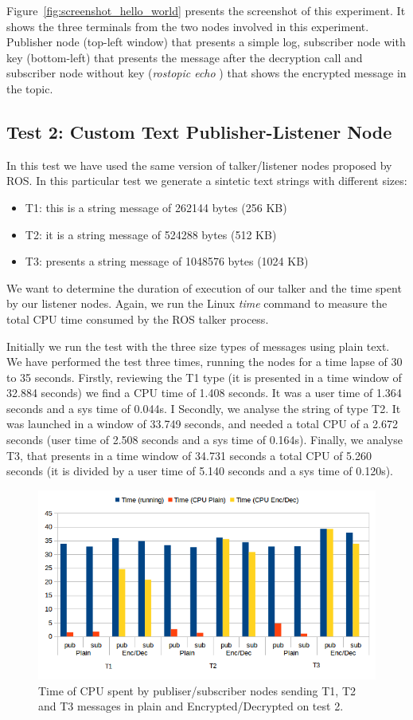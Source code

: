 \documentclass[journal,twoside]{JoPhA}
\begin{document}
Figure~\ref{fig:screenshot_hello_world} presents the screenshot of this experiment. It shows the three terminals from the two nodes involved in this experiment. Publisher node (top-left window) that presents a simple log, subscriber node with key (bottom-left) that presents the message after the decryption call and subscriber node without key ({\em rostopic echo }) that shows the encrypted message in the topic.


\subsection{Test 2: Custom Text Publisher-Listener Node}


In this test we have used the same version of talker/listener nodes proposed by ROS. In this particular test we generate a sintetic text strings with different sizes:
\begin{itemize}
\item T1: this is a string message of 262144 bytes (256 KB)
\item T2: it is a string message of 524288 bytes (512 KB)
\item T3: presents a string message of 1048576 bytes (1024 KB)
\end{itemize}  


We want to determine the duration of execution of our talker and the time spent by our listener nodes. Again, we run the Linux {\em time} command to measure the total CPU time consumed by the ROS talker process. 

Initially we run the test with the three size types of messages using plain text. 
We have performed the test three times, running the nodes for a time lapse of 30 to 35 seconds. 
Firstly, reviewing the  T1 type (it is presented in a time window of 32.884 seconds) we find   a CPU time of 1.408 seconds. It was a user time of  1.364 seconds and a sys time of 0.044s. I
Secondly, we analyse the string of type T2. It was launched in a  window of 33.749 seconds, and needed a total CPU of a  2.672 seconds (user time of 2.508 seconds and a sys time of 0.164s). 
Finally, we analyse T3, that presents in a time window of 34.731 seconds a total CPU of 5.260 seconds (it is divided by a user time of  5.140 seconds and a sys time of 0.120s).

\begin{figure}[ht!]
	\includegraphics[width=.5\textwidth]{Figura_t1t2t3.png}
	\caption{Time of CPU spent by publiser/subscriber nodes sending T1, T2 and T3 messages in plain and Encrypted/Decrypted on test 2.}
	\label{fig:time_text_CPU}
\end{figure}
\end{document}
